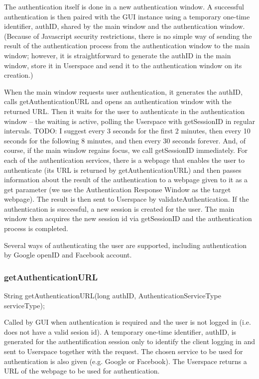 The authentication itself is done in a new authentication window.
A successful authentication is then paired with the GUI instance using a temporary one-time identifier, authID, shared by the main window and the authentication window.
(Because of Javascript security restrictions, there is no simple way of sending the result of the authentication process from the authentication window to the main window;
however, it is straightforward to generate the authID in the main window, store it in Userspace and send it to the authentication window on its creation.)

When the main window requests user authentication, it generates the authID, calls getAuthenticationURL and opens an authentication window with the returned URL.
Then it waits for the user to authenticate in the authentication window
-- the waiting is active, polling the Userspace with getSessionID in regular intervals.
TODO: I suggest every 3 seconds for the first 2 minutes, then every 10 seconds for the following 8 minutes, and then every 30 seconds forever.
And, of course, if the main window regains focus, we call getSessionID immediately.
For each of the authentication services, there is a webpage that enables the user to authenticate
(its URL is returned by getAuthenticationURL)
and then passes information about the result of the authentication to a webpage given to it as a get parameter
(we use the Authentication Response Window as the target webpage).
The result is then sent to Userspace by validateAuthentication.
If the authentication is successful, a new session is created for the user.
The main window then acquires the new session id via getSessionID and the authentication process is completed.

Several ways of authenticating the user are supported, including authentication by Google openID and Facebook account.

\subsubsection{getAuthenticationURL}
    String getAuthenticationURL(long authID, AuthenticationServiceType serviceType);

Called by GUI when authentication is required and the user is not logged in (i.e. does not have a valid sesion id).
A temporary one-time identifier, authID, is generated for the authentification session only to identify the client logging in and sent to Userspace together with the request.
The chosen service to be used for authentication is also given (e.g. Google or Facebook).
The Userspace returns a URL of the webpage to be used for authentication.

